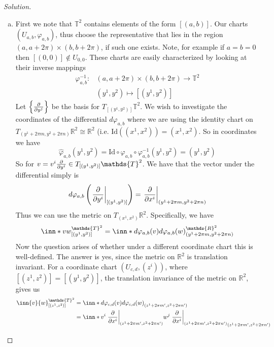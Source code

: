 \documentclass[a4paper]{article}
\begin{document}
\begin{proof}[Solution]
  \begin{enumerate}[(a)]
    \item  First we note that $\mathds{T}^2$ contains elements of the form $[(a,b)]$. Our charts $(U_{a,b}, \varphi_{a,b})$, thus choose the representative that lies in the region $(a,a + 2\pi) \times (b, b + 2\pi)$, if such one exists. Note, for example if $a = b = 0$ then $[(0,0)] \notin U_{0,0}$. These charts are easily characterized by looking at their inverse mappings
      \[
        \begin{aligned}
          \varphi_{a,b}^{-1}:& (a, a+ 2\pi) \times (b, b+2\pi) \rightarrow \mathds{T}^2 \\
          &(y^1,y^2) \mapsto [(y^1,y^2)] 
        \end{aligned}
      \]
      Let $\left\{ \pdv{y^j} \right\}$ be the basis for $T_{[(y^1, y^2)]}\mathds{T}^2$. We wish to investigate the coordinates of the differential $d \varphi_{a,b}$ where we are using the identity chart on $T_{(y^1 + 2\pi m, y^2 + 2\pi n)} \mathds{R}^2 \cong \mathds{R}^2$ (i.e. $\text{Id}((x^1, x^2)) = (x^1, x^2)$. So in coordinates we have
      \[
        \hat{\varphi}_{a,b}(y^1, y^2) = \text{Id} \circ \varphi_{a,b} \circ \varphi_{a,b}^{-1} (y^1, y^2) = (y^1, y^2)
      \]
      So for $v = v^i \pdv{y^i} \in  T_{[(y^1, y^2)]}\mathds{T}^2$. We have that the vector under the differential simply is
      \[
        d\varphi_{a,b} \left( \eval{\pdv{y^i}}_{[(y^1, y^2)]} \right) = \eval{\pdv{x^i}}_{(y^1 + 2\pi m, y^2 + 2\pi n)}
      \]
      Thus we can use the metric on $T_{(x^1, x^2)}\mathds{R}^2$. Specifically, we have
      \[
        \inn*{v}{w}^{\mathds{T}^2}_{[(y^1, y^2)]} = \inn*{d\varphi_{a,b}(v)}{d\varphi_{a,b}(w)}_{(y^1 + 2\pi m, y^2 + 2\pi n)}^{\mathds{R}^2}
      \]
      Now the question arises of whether under a different coordinate chart this is well-defined. The answer is yes, since the metric on $\mathds{R}^2$ is translation invariant. For a coordinate chart $(U_{c,d}, (z^i))$, where $[(z^1, z^2)] = [(y^1, y^2)]$, the translation invariance of the metric on $\mathds{R}^2$, gives us
      \[
        \begin{aligned}
          \inn{v}{w}^{\mathds{T}^2}_{[(z^1, z^2)]} &= \inn*{d \varphi_{c,d}(v)}{d \varphi_{c,d}(w)}_{(z^1 + 2\pi m', z^2 + 2\pi n')} \\
                                                   &= \inn*{ v^i \eval{\pdv{x^i}}_{(z^1 + 2\pi m', z^2 + 2\pi n')}}{w^j \eval{\pdv{x^i}}_{(z^1 + 2\pi m', z^2 + 2\pi n')}}_{(z^1 + 2\pi m', z^2 + 2\pi n')}  \\

\end{aligned}\]
\end{enumerate}
\end{proof}
\end{document}
